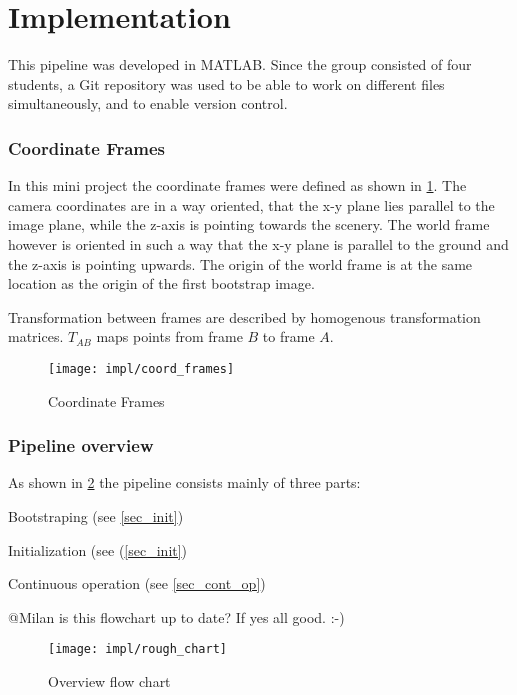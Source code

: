 \section{Implementation}

This pipeline was developed in MATLAB. Since the group consisted of four students, a Git repository was used to be able to work on different files simultaneously, and to enable version control.

\subsubsection{Coordinate Frames}
In this mini project the coordinate frames were defined as shown in \cref{img_coord_frames}. The camera coordinates are in a way oriented, that the x-y plane lies parallel to the image plane, while the z-axis is pointing towards the scenery. The world frame however is oriented in such a way that the x-y plane is parallel to the ground and the z-axis is pointing upwards. The origin of the world frame is at the same location as the origin of the first bootstrap image.

Transformation between frames are described by homogenous transformation matrices. $T_{AB}$ maps points from frame $B$ to frame $A$.

\begin{figure}[ht]
	\centering
	\texttt{[image: impl/coord\_frames]}
	\caption{Coordinate Frames}
	\label{img_coord_frames}
\end{figure}

\subsubsection{Pipeline overview}

As shown in \cref{img_flow_rough} the pipeline consists mainly of three parts:
\begin{compactenum}
	\item Bootstraping (see \cref{sec_init})
	\item Initialization (see (\cref{sec_init})
	\item Continuous operation (see \cref{sec_cont_op})
\end{compactenum}

@Milan is this flowchart up to date? If yes all good. :-)

\begin{figure}[ht]
	\centering
	\texttt{[image: impl/rough\_chart]}
	\caption{Overview flow chart}
	\label{img_flow_rough}
\end{figure}

